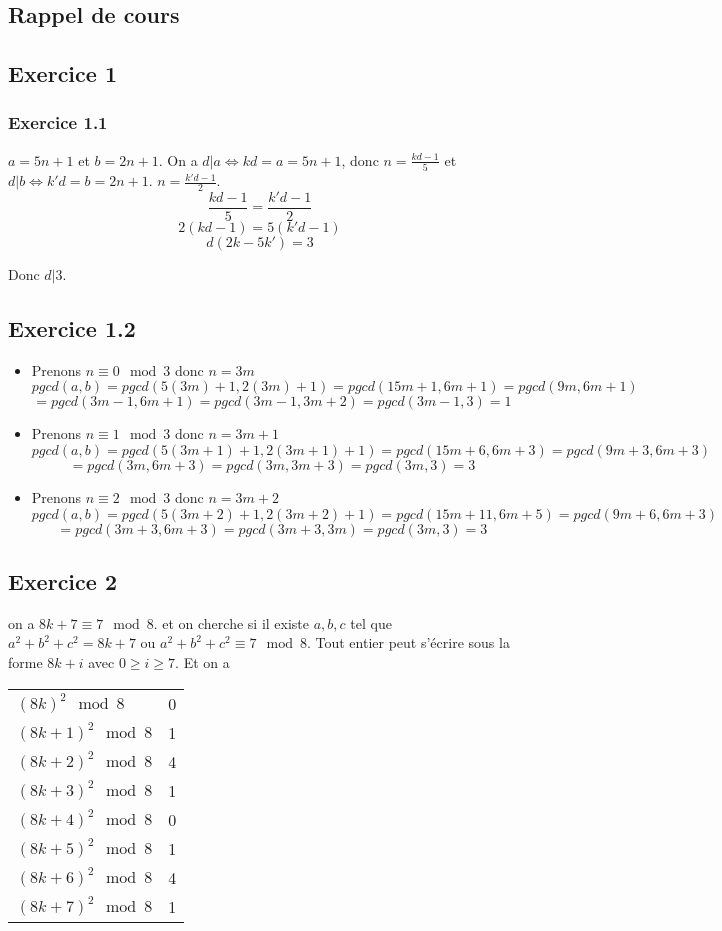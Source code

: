 \documentclass[]{book}
\theoremstyle{definition}
\begin{document}
\subsection*{Rappel de cours}


\newpage
\subsection*{Exercice 1}
\subsubsection*{Exercice 1.1}
$a = 5n+1$ et $b=2n+1$. On a $d|a \Leftrightarrow kd=a=5n+1$, donc $n=\frac{kd-1}{5}$ et $d|b \Leftrightarrow k'd=b=2n+1$.
$n=\frac{k'd-1}{2}$.
$$\frac{kd-1}{5} = \frac{k'd-1}{2}$$
$$2(kd-1) = 5(k'd-1)$$
$$d(2k-5k') = 3$$

Donc $d|3$.

\subsection*{Exercice 1.2}
\begin{itemize}
\item Prenons $n \equiv 0 \mod 3$ donc $n = 3m$
$$pgcd(a,b) = pgcd(5(3m)+1, 2(3m)+1) = pgcd(15m+1, 6m+1) = pgcd(9m, 6m +1) $$
$$= pgcd(3m-1, 6m+1) = pgcd(3m-1, 3m+2) = pgcd(3m-1, 3) = 1$$
\item Prenons $n \equiv 1 \mod 3$ donc $n = 3m+1$
$$pgcd(a,b) = pgcd(5(3m+1)+1, 2(3m+1)+1) = pgcd(15m+6, 6m+3) = pgcd(9m+3, 6m +3)$$
$$= pgcd(3m, 6m+3) = pgcd(3m, 3m+3) = pgcd(3m, 3) = 3$$
\item Prenons $n \equiv 2 \mod 3$ donc $n = 3m+2$
$$pgcd(a,b) = pgcd(5(3m+2)+1, 2(3m+2)+1) = pgcd(15m+11, 6m+5) = pgcd(9m+6, 6m +3)$$
$$= pgcd(3m+3, 6m+3) = pgcd(3m+3, 3m) = pgcd(3m, 3) = 3$$
\end{itemize}


\subsection*{Exercice 2}
on a $8k+7 \equiv 7 \mod 8$. et on cherche si il existe $a,b,c$ tel que $a^2+b^2+c^2=8k+7$ ou $a^2+b^2+c^2 \equiv 7 \mod 8$. Tout entier peut s'\'ecrire sous la forme $8k+i$ avec $0 \geq i \geq 7$. Et on a 
\begin{center}
\begin{tabular}{ l l}
 $(8k)^2 \mod 8$ & 0 \\ 
 $(8k+1)^2 \mod 8$ & 1 \\ 
 $(8k+2)^2 \mod 8$ & 4 \\ 
 $(8k+3)^2 \mod 8$ & 1 \\ 
 $(8k+4)^2 \mod 8$ & 0 \\ 
 $(8k+5)^2 \mod 8$ & 1 \\ 
 $(8k+6)^2 \mod 8$ & 4 \\ 
 $(8k+7)^2 \mod 8$ & 1 \\ 
\end{tabular}
\end{center}
\end{document}
